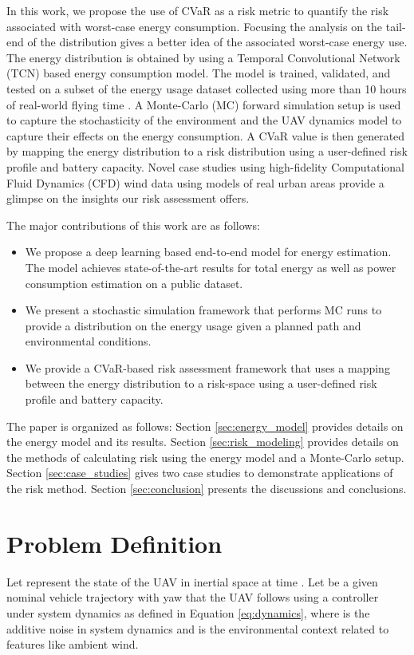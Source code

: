 \documentclass[letterpaper, 10 pt, conference]{ieeeconf}
\begin{document}
\par In this work, we propose the use of CVaR as a risk metric to quantify the risk associated with worst-case energy consumption. Focusing the analysis on the tail-end of the distribution gives a better idea of the associated worst-case energy use. The energy distribution is obtained by using a Temporal Convolutional Network (TCN) based energy consumption model. The model is trained, validated, and tested on a subset of the energy usage dataset collected using more than 10 hours of real-world flying time \cite{rodrigues2021inflight, Rodrigues}. A Monte-Carlo (MC) forward simulation setup is used to capture the stochasticity of the environment and the UAV dynamics model to capture their effects on the energy consumption. A CVaR value is then generated by mapping the energy distribution to a risk distribution using a user-defined risk profile and battery capacity. Novel case studies using high-fidelity Computational Fluid Dynamics (CFD) wind data using models of real urban areas provide a glimpse on the insights our risk assessment offers. 

\par The major contributions of this work are as follows:
\begin{itemize}
    \item We propose a deep learning based end-to-end model for energy estimation. The model achieves state-of-the-art results for total energy as well as power consumption estimation on a public dataset.
    \item We present a stochastic simulation framework that performs MC runs to provide a distribution on the energy usage given a planned path and environmental conditions.
    \item We provide a CVaR-based risk assessment framework that uses a mapping between the energy distribution to a risk-space using a user-defined risk profile and battery capacity.  
\end{itemize}

\par The paper is organized as follows: Section \ref{sec:energy_model} provides details on the energy model and its results. Section \ref{sec:risk_modeling} provides details on the methods of calculating risk using the energy model and a Monte-Carlo setup. Section \ref{sec:case_studies} gives two case studies to demonstrate applications of the risk method. Section \ref{sec:conclusion} presents the discussions and conclusions. 


\section{Problem Definition}
\label{sec:problem}
Let  represent the state of the UAV in inertial space at time . Let  be a given nominal vehicle trajectory with yaw that the UAV follows using a controller  under system dynamics as defined in Equation \ref{eq:dynamics}, where  is the additive noise in system dynamics and  is the environmental context related to features like ambient wind. 
\end{document}
